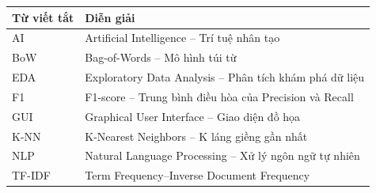 \begin{longtable}{|p{3.2cm}|p{10.1cm}|}
\hline
\textbf{Từ viết tắt} & \textbf{Diễn giải}\\ \hline
AI & Artificial Intelligence -- Trí tuệ nhân tạo\\ \hline
BoW & Bag-of-Words -- Mô hình túi từ\\ \hline
EDA & Exploratory Data Analysis -- Phân tích khám phá dữ liệu\\ \hline
F1 & F1-score -- Trung bình điều hòa của Precision và Recall\\ \hline
GUI & Graphical User Interface -- Giao diện đồ họa\\ \hline
K-NN & K-Nearest Neighbors -- K láng giềng gần nhất\\ \hline
NLP & Natural Language Processing -- Xử lý ngôn ngữ tự nhiên\\ \hline
TF-IDF & Term Frequency--Inverse Document Frequency\\ \hline
\end{longtable}

